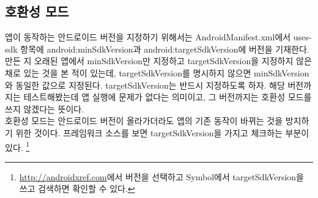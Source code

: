 \subsection{호환성 모드}
앱이 동작하는 안드로이드 버전을 지정하기 위해서는 AndroidManifest.xml에서 uses-sdk 항목에  android:min\-SdkVersion과 android:targetSdkVersion에 버전을 기재한다. 
만든 지 오래된 앱에서 minSdkVersion만 지정하고 targetSdkVersion을 지정하지 않은 채로 있는 것을 본 적이 있는데, targetSdkVersion를 명시하지 않으면 minSdkVersion와 동일한 값으로 지정된다.
targetSdkVersion는 반드시 지정하도록 하자. 해당 버전까지는 테스트해봤는데 앱 실행에 문제가 없다는 의미이고, 그 버전까지는 호환성 모드를 쓰지 않겠다는 뜻이다.\\

호환성 모드는 안드로이드 버전이 올라가더라도 앱의 기존 동작이 바뀌는 것을 방지하기 위한 것이다.
프레임워크 소스를 보면 targetSdkVersion을 가지고 체크하는 부분이 있다.
\footnote{\url{http://androidxref.com}에서 버전을 선택하고 Symbol에서 targetSdkVersion을 쓰고 검색하면 확인할 수 있다.}\\

